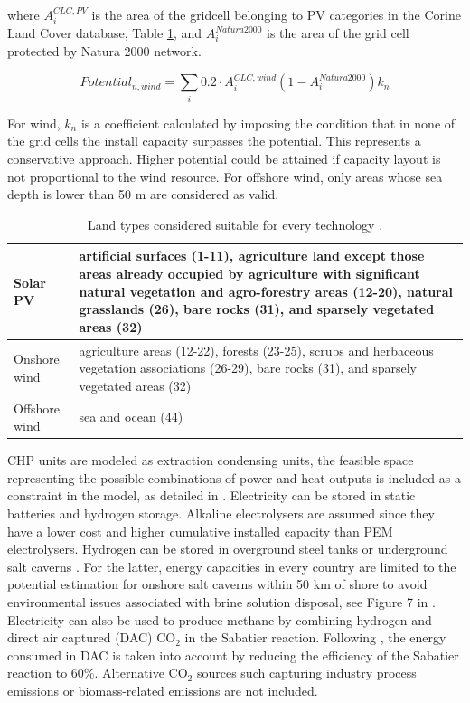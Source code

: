 \documentclass[3p]{elsarticle} %
\begin{document}
where $A^{CLC, PV}_i$ is the area of the gridcell belonging to PV categories in the Corine Land Cover database, Table \ref{tab_Corine}, and $A^{Natura 2000}_i$ is the area of the grid cell protected by Natura 2000 network. 

\begin{equation}
	Potential_{n, wind} = \sum_i 0.2 \cdot A^{CLC, wind}_i (1- A^{Natura 2000}_i) k_n
\end{equation}

For wind, $k_n$ is a coefficient calculated by imposing the condition that in none of the grid cells the install capacity surpasses the potential. This represents a conservative approach. Higher potential could be attained if capacity layout is not proportional to the wind resource. For offshore wind, only areas whose sea depth is lower than 50 m are considered as valid. 


\begin{table}[!b]
\footnotesize
\centering
\begin{threeparttable}
\caption{Land types considered suitable for every technology \cite{Corine_2014, Scholz_2012}.} \label{tab_Corine}
\centering
\begin{tabularx}{13cm}{lp{10cm}}
\toprule
Solar PV  & artificial surfaces (1-11), agriculture land except those areas already occupied by agriculture with significant natural vegetation and agro-forestry areas (12-20), natural grasslands (26),
bare rocks (31), and sparsely vegetated areas (32) \\
\midrule
Onshore wind & agriculture areas (12-22), forests (23-25), scrubs and herbaceous vegetation associations (26-29), bare rocks (31), and sparsely vegetated areas (32) \\
\midrule
Offshore wind & sea and ocean (44) \\
\bottomrule
\end{tabularx}
\end{threeparttable}
\end{table}

CHP units are modeled as extraction condensing units, the feasible space representing the possible combinations of power and heat outputs is included as a constraint in the model, as detailed in \cite{Brown_2018}. Electricity can be stored in static batteries and hydrogen storage. Alkaline electrolysers are assumed since they have a lower cost \cite{DEA_2019} and higher cumulative installed capacity \cite{Staffell_2019} than PEM electrolysers. Hydrogen can be stored in overground steel tanks or underground salt caverns \cite{Staffell_2019}. For the latter, energy capacities in every country are limited to the potential estimation for onshore salt caverns within 50 km of shore to avoid environmental issues associated with brine solution disposal, see Figure 7 in \cite{Caglayan_2019}. Electricity can also be used to produce methane by combining hydrogen and direct air captured (DAC) CO$_2$ in the Sabatier reaction. Following \cite{Brown_2018}, the energy consumed in DAC is taken into account by reducing the efficiency of the Sabatier reaction to 60\%. Alternative CO$_2$ sources such capturing industry process emissions or biomass-related emissions are not included. \
\end{document}
